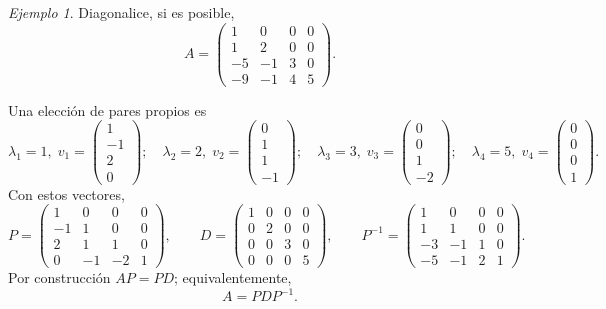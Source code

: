 \documentclass[12pt]{article}
\theoremstyle{remark}
\newtheorem{Ejem}[definicion]{Ejemplo}
\begin{document}
\begin{Ejem}


Diagonalice, si es posible,
\[
A=\begin{pmatrix}1 & 0 & 0 & 0\\1 & 2 & 0 & 0\\-5 & -1 & 3 & 0\\-9 & -1 & 4 & 5\end{pmatrix}.
\]

\scriptsize
Una elección de pares propios es
\[
\lambda_1=1,\;v_1=\begin{pmatrix}1\\-1\\2\\0\end{pmatrix};\quad \lambda_2=2,\;v_2=\begin{pmatrix}0\\1\\1\\-1\end{pmatrix};\quad \lambda_3=3,\;v_3=\begin{pmatrix}0\\0\\1\\-2\end{pmatrix};\quad \lambda_4=5,\;v_4=\begin{pmatrix}0\\0\\0\\1\end{pmatrix}.
\]
Con estos vectores,
\[
P=\begin{pmatrix}1 & 0 & 0 & 0\\-1 & 1 & 0 & 0\\2 & 1 & 1 & 0\\0 & -1 & -2 & 1\end{pmatrix},\qquad D=\begin{pmatrix}1 & 0 & 0 & 0\\0 & 2 & 0 & 0\\0 & 0 & 3 & 0\\0 & 0 & 0 & 5\end{pmatrix},\qquad P^{-1}=\begin{pmatrix}1 & 0 & 0 & 0\\1 & 1 & 0 & 0\\-3 & -1 & 1 & 0\\-5 & -1 & 2 & 1\end{pmatrix}.
\]
Por construcción $AP=PD$; equivalentemente,
\[
\boxed{A=PDP^{-1}}.
\]

\end{Ejem}
\end{document}
